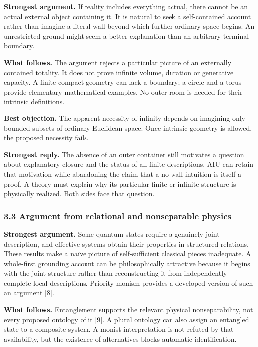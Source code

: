 \documentclass[
  10pt,
  a4paper,
]{article}
\begin{document}
\textbf{Strongest argument.} If reality includes everything actual,
there cannot be an actual external object containing it. It is natural
to seek a self-contained account rather than imagine a literal wall
beyond which further ordinary space begins. An unrestricted ground might
seem a better explanation than an arbitrary terminal boundary.

\textbf{What follows.} The argument rejects a particular picture of an
externally contained totality. It does not prove infinite volume,
duration or generative capacity. A finite compact geometry can lack a
boundary; a circle and a torus provide elementary mathematical examples.
No outer room is needed for their intrinsic definitions.

\textbf{Best objection.} The apparent necessity of infinity depends on
imagining only bounded subsets of ordinary Euclidean space. Once
intrinsic geometry is allowed, the proposed necessity fails.

\textbf{Strongest reply.} The absence of an outer container still
motivates a question about explanatory closure and the status of all
finite descriptions. AIU can retain that motivation while abandoning the
claim that a no-wall intuition is itself a proof. A theory must explain
why its particular finite or infinite structure is physically realized.
Both sides face that question.

\subsubsection{3.3 Argument from relational and nonseparable
physics}\label{argument-from-relational-and-nonseparable-physics}

\textbf{Strongest argument.} Some quantum states require a genuinely
joint description, and effective systems obtain their properties in
structured relations. These results make a naïve picture of
self-sufficient classical pieces inadequate. A whole-first grounding
account can be philosophically attractive because it begins with the
joint structure rather than reconstructing it from independently
complete local descriptions. Priority monism provides a developed
version of such an argument {[}8{]}.

\textbf{What follows.} Entanglement supports the relevant physical
nonseparability, not every proposed ontology of it {[}9{]}. A plural
ontology can also assign an entangled state to a composite system. A
monist interpretation is not refuted by that availability, but the
existence of alternatives blocks automatic identification.
\end{document}
